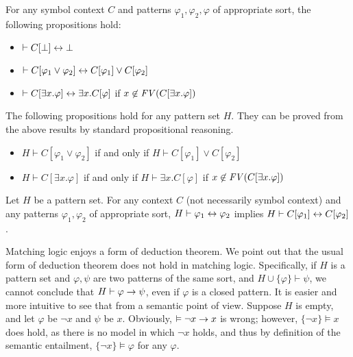 \documentclass{amsart}
\begin{document}
\begin{proposition}
\label{prop_propgation_of_symbol_application}
For any symbol context $C$ and patterns $\varphi_1, \varphi_2, \varphi$
of appropriate sort,
the following propositions hold:
\begin{itemize}
\item $ \vdash 
          C[\bot] \leftrightarrow 
          \bot$
\item $ \vdash 
          C[\varphi_1 \vee \varphi_2] \leftrightarrow
          C[\varphi_1] \vee
          C[\varphi_2]$
\item $ \vdash
          C[\exists x . \varphi] \leftrightarrow
          \exists x . C[\varphi] $
       \quad if $x \not\in \mathit{FV}(C[\exists x . \varphi])$
\end{itemize}
The following propositions hold for any pattern set $H$.
They can be proved from the above results
by standard propositional reasoning.
\begin{itemize}
\item $H \vdash 
          C[\varphi_1 \vee \varphi_2]$
      if and only if
      $H \vdash C[\varphi_1] \vee
                     C[\varphi_2]$
\item $H \vdash
          C[\exists x . \varphi] $
      if and only if
      $H \vdash \exists x . C[\varphi]$
      \quad if $x \not\in \mathit{FV}(C[\exists x . \varphi])$
\end{itemize}
\end{proposition}

\begin{proposition}
\label{prop_congruence_provability_equiv}
Let $H$ be a pattern set.
For any context $C$ (not necessarily symbol context)
and any patterns $\varphi_1, \varphi_2$ of appropriate sort,
$H \vdash \varphi_1 \leftrightarrow \varphi_2$
implies
$H \vdash C[\varphi_1] \leftrightarrow C[\varphi_2]$.
\end{proposition}

Matching logic enjoys a form of deduction theorem.
We point out that the usual form of deduction theorem does not hold
in matching logic.
Specifically, if $H$ is a pattern set
and $\varphi,\psi$ are two patterns of the same sort,
and $H \cup \{\varphi\} \vdash \psi$,
we cannot conclude that
$H \vdash \varphi \to \psi$,
even if $\varphi$ is a closed pattern.
It is easier and more intuitive to see that from a semantic point of view.
Suppose $H$ is empty,
and let $\varphi$ be $\neg x$ and $\psi$ be $x$.
Obviously, $\vDash \neg x \to x$ is wrong;
however, $\{\neg x\} \vDash x$ does hold,
as there is no model in which $\neg x$ holds,
and thus by definition of the semantic entailment, 
$\{\neg x\} \vDash \varphi$ for any $\varphi$.
\end{document}
